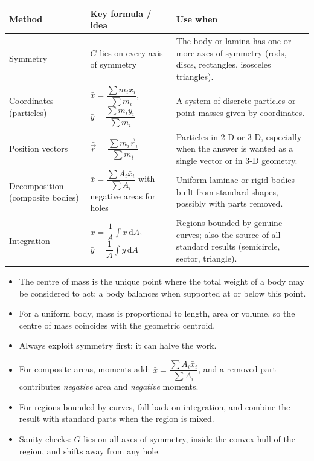 \documentclass[11pt]{article}
\newcommand{\cle}[1]{{\popxbold\color{popdark}#1}}
\begin{document}
\begin{center}
\begin{tabularx}{\linewidth}{|l|X|X|}
\hline
\rowcolor{popblueL}
\textbf{Method} & \textbf{Key formula / idea} & \textbf{Use when} \\
\hline
Symmetry & $G$ lies on every axis of symmetry & The body or lamina has one or more axes of symmetry (rods, discs, rectangles, isosceles triangles). \\
\hline
Coordinates (particles) & $\bar{x}=\dfrac{\sum m_i x_i}{\sum m_i}$, \ $\bar{y}=\dfrac{\sum m_i y_i}{\sum m_i}$ & A system of discrete particles or point masses given by coordinates. \\
\hline
Position vectors & $\bar{\vec{r}}=\dfrac{\sum m_i\vec{r}_i}{\sum m_i}$ & Particles in 2-D or 3-D, especially when the answer is wanted as a single vector or in 3-D geometry. \\
\hline
Decomposition (composite bodies) & $\bar{x}=\dfrac{\sum A_i\bar{x}_i}{\sum A_i}$ with negative areas for holes & Uniform laminae or rigid bodies built from standard shapes, possibly with parts removed. \\
\hline
Integration & $\bar{x}=\dfrac{1}{A}\displaystyle\int x\,\mathrm{d}A$, \ $\bar{y}=\dfrac{1}{A}\displaystyle\int y\,\mathrm{d}A$ & Regions bounded by genuine curves; also the source of all standard results (semicircle, sector, triangle). \\
\hline
\end{tabularx}
\end{center}

\begin{aretenir}
\begin{itemize}
\item The centre of mass is the unique point where the total weight of a body may be considered to act; a body balances when supported at or below this point.
\item For a uniform body, mass is proportional to length, area or volume, so the centre of mass coincides with the geometric \cle{centroid}.
\item Always exploit symmetry first; it can halve the work.
\item For composite areas, moments add: $\bar{x}=\dfrac{\sum A_i\bar{x}_i}{\sum A_i}$, and a removed part contributes \emph{negative} area and \emph{negative} moments.
\item For regions bounded by curves, fall back on integration, and combine the result with standard parts when the region is mixed.
\item Sanity checks: $G$ lies on all axes of symmetry, inside the convex hull of the region, and shifts away from any hole.
\end{itemize}
\end{aretenir}
\end{document}
